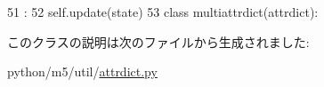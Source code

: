 \begin{DoxyCode}
51                                  :
52         self.update(state)
53 
class multiattrdict(attrdict):
\end{DoxyCode}


このクラスの説明は次のファイルから生成されました:\begin{DoxyCompactItemize}
\item 
python/m5/util/\hyperlink{attrdict_8py}{attrdict.py}\end{DoxyCompactItemize}
